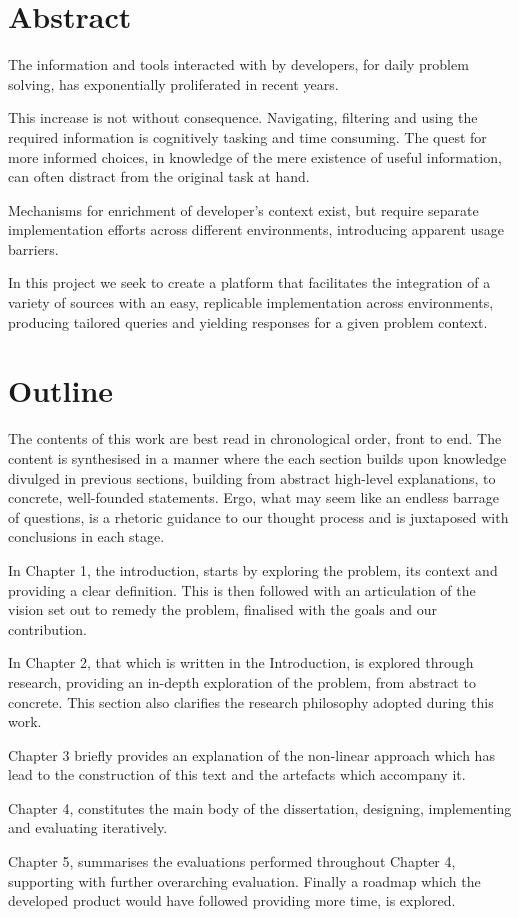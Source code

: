 \chapter*{Abstract}

The information and tools interacted with by developers, for daily problem solving, has exponentially proliferated in recent years. 

This increase is not without consequence. Navigating, filtering and using the required information is cognitively tasking and time consuming. The quest for more informed choices, in knowledge of the mere existence of useful information, can often distract from the original task at hand. 

Mechanisms for enrichment of developer's context exist, but require separate implementation efforts across different environments, introducing apparent usage barriers.

In this project we seek to create a platform that facilitates the integration of a variety of sources with an easy, replicable implementation across environments, producing tailored queries and yielding responses for a given problem context.  



\chapter*{Outline}

The contents of this work are best read in chronological order, front to end. The content is synthesised in a manner where the each section builds upon knowledge divulged in previous sections, building from abstract high-level explanations, to concrete, well-founded statements. Ergo, what may seem like an endless barrage of questions, is a rhetoric guidance to our thought process and is juxtaposed with conclusions in each stage.

In Chapter 1, the introduction, starts by exploring the problem, its context and providing a clear definition. This is then followed with an articulation of the vision set out to remedy the problem, finalised with the goals and our contribution.

In Chapter 2, that which is written in the Introduction, is explored through research, providing an in-depth exploration of the problem, from abstract to concrete. This section also clarifies the research philosophy adopted during this work.

Chapter 3 briefly provides an explanation of the non-linear approach which has lead to the construction of this text and the artefacts which accompany it.

Chapter 4, constitutes the main body of the dissertation, designing, implementing and evaluating iteratively.

Chapter 5, summarises the evaluations performed throughout Chapter 4, supporting with further overarching evaluation. Finally a roadmap which the developed product would have followed providing more time, is explored.
